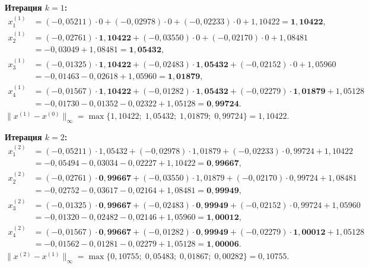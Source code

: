 \documentclass[a4paper, final]{article}
\begin{document}
\medskip\textbf{Итерация $k=1$:}
\begin{align*}
x_1^{(1)} &= (-0{,}05211)\cdot0 + (-0{,}02978)\cdot0 + (-0{,}02233)\cdot0 + 1{,}10422 = \mathbf{1{,}10422},\\
x_2^{(1)} &= (-0{,}02761)\cdot\mathbf{1{,}10422} + (-0{,}03550)\cdot0 + (-0{,}02170)\cdot0 + 1{,}08481\\
           &= -0{,}03049 + 1{,}08481 = \mathbf{1{,}05432},\\
x_3^{(1)} &= (-0{,}01325)\cdot\mathbf{1{,}10422} + (-0{,}02483)\cdot\mathbf{1{,}05432} + (-0{,}02152)\cdot0 + 1{,}05960\\
           &= -0{,}01463 - 0{,}02618 + 1{,}05960 = \mathbf{1{,}01879},\\
x_4^{(1)} &= (-0{,}01567)\cdot\mathbf{1{,}10422} + (-0{,}01282)\cdot\mathbf{1{,}05432}
             + (-0{,}02279)\cdot\mathbf{1{,}01879} + 1{,}05128\\
           &= -0{,}01730 - 0{,}01352 - 0{,}02322 + 1{,}05128 = \mathbf{0{,}99724}.
\end{align*}
$\|x^{(1)}-x^{(0)}\|_\infty = \max\{1{,}10422;\;1{,}05432;\;1{,}01879;\;0{,}99724\} = 1{,}10422.$

\medskip\textbf{Итерация $k=2$:}
\begin{align*}
x_1^{(2)} &= (-0{,}05211)\cdot1{,}05432 + (-0{,}02978)\cdot1{,}01879 + (-0{,}02233)\cdot0{,}99724 + 1{,}10422\\
           &= -0{,}05494 - 0{,}03034 - 0{,}02227 + 1{,}10422 = \mathbf{0{,}99667},\\
x_2^{(2)} &= (-0{,}02761)\cdot\mathbf{0{,}99667} + (-0{,}03550)\cdot1{,}01879 + (-0{,}02170)\cdot0{,}99724 + 1{,}08481\\
           &= -0{,}02752 - 0{,}03617 - 0{,}02164 + 1{,}08481 = \mathbf{0{,}99949},\\
x_3^{(2)} &= (-0{,}01325)\cdot\mathbf{0{,}99667} + (-0{,}02483)\cdot\mathbf{0{,}99949} + (-0{,}02152)\cdot0{,}99724 + 1{,}05960\\
           &= -0{,}01320 - 0{,}02482 - 0{,}02146 + 1{,}05960 = \mathbf{1{,}00012},\\
x_4^{(2)} &= (-0{,}01567)\cdot\mathbf{0{,}99667} + (-0{,}01282)\cdot\mathbf{0{,}99949}
             + (-0{,}02279)\cdot\mathbf{1{,}00012} + 1{,}05128\\
           &= -0{,}01562 - 0{,}01281 - 0{,}02279 + 1{,}05128 = \mathbf{1{,}00006}.
\end{align*}
$\|x^{(2)}-x^{(1)}\|_\infty = \max\{0{,}10755;\;0{,}05483;\;0{,}01867;\;0{,}00282\} = 0{,}10755.$
\end{document}
